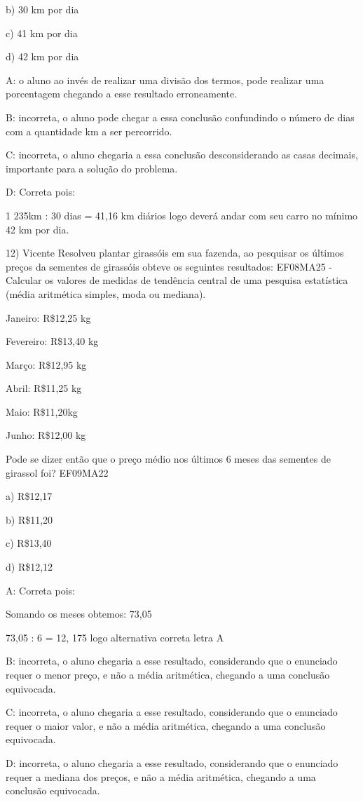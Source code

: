 b) 30 km por dia

c) 41 km por dia

d) 42 km por dia

A: o aluno ao invés de realizar uma divisão dos termos, pode realizar
uma porcentagem chegando a esse resultado erroneamente.

B: incorreta, o aluno pode chegar a essa conclusão confundindo o número
de dias com a quantidade km a ser percorrido.

C: incorreta, o aluno chegaria a essa conclusão desconsiderando as casas
decimais, importante para a solução do problema.

D: Correta pois:

1 235km : 30 dias = 41,16 km diários logo deverá andar com seu carro no
mínimo 42 km por dia.

12) Vicente Resolveu plantar girassóis em sua fazenda, ao pesquisar os
últimos preços da sementes de girassóis obteve os seguintes resultados:
EF08MA25 - Calcular os valores de medidas de tendência central de uma
pesquisa estatística (média aritmética simples, moda ou mediana).

Janeiro: R\$12,25 kg

Fevereiro: R\$13,40 kg

Março: R\$12,95 kg

Abril: R\$11,25 kg

Maio: R\$11,20kg

Junho: R\$12,00 kg

Pode se dizer então que o preço médio nos últimos 6 meses das sementes
de girassol foi? EF09MA22

a) R\$12,17

b) R\$11,20

c) R\$13,40

d) R\$12,12

A: Correta pois:

Somando os meses obtemos: 73,05

73,05 : 6 = 12, 175 logo alternativa correta letra A

B: incorreta, o aluno chegaria a esse resultado, considerando que o
enunciado requer o menor preço, e não a média aritmética, chegando a uma
conclusão equivocada.

C: incorreta, o aluno chegaria a esse resultado, considerando que o
enunciado requer o maior valor, e não a média aritmética, chegando a uma
conclusão equivocada.

D: incorreta, o aluno chegaria a esse resultado, considerando que o
enunciado requer a mediana dos preços, e não a média aritmética,
chegando a uma conclusão equivocada.

